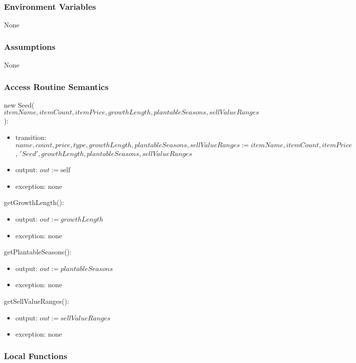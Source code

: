 \documentclass[12pt, titlepage]{article}
\begin{document}
\subsubsection{Environment Variables}

None
\subsubsection{Assumptions}

None

\subsubsection{Access Routine Semantics}

\noindent new Seed($\mathit{itemName}, \mathit{itemCount}, \mathit{itemPrice}, growthLength, plantableSeasons, sellValueRanges$):
\begin{itemize}
\item transition: $\mathit{name}, \mathit{count}, \mathit{price}, \mathit{type}, growthLength, plantableSeasons, sellValueRanges:= \mathit{itemName}, \mathit{itemCount}, \mathit{itemPrice}$, $\mathit{'Seed'} , growthLength, plantableSeasons, sellValueRanges$
\item output: $out := \mbox{self}$
\item exception: none
\end{itemize}


\noindent getGrowthLength():
\begin{itemize}
\item output: $out := growthLength$
\item exception: none
\end{itemize}

\noindent getPlantableSeasons():
\begin{itemize}
\item output: $out := plantableSeasons$
\item exception: none
\end{itemize}

\noindent getSellValueRanges():
\begin{itemize}
\item output: $out := sellValueRanges$
\item exception: none
\end{itemize}

\subsubsection{Local Functions}
\end{document}

